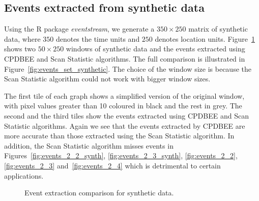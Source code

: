 \documentclass[a4paper,11pt]{article}
\begin{document}
\subsection{Events extracted from synthetic data}\label{subsec:eventsSynthetic}

Using the R package \textit{eventstream}, we generate a $350 \times 250$ matrix of synthetic data, where $350$ denotes the time units and $250$ denotes location units. Figure~\ref{fig:events_set_synthetic_just2} shows two $50 \times 250$ windows of synthetic data and the events extracted using CPDBEE and Scan Statistic algorithms. The full comparison is illustrated in Figure~\ref{fig:events_set_synthetic}. The choice of the window size is because the Scan Statistic algorithm could not work with bigger window sizes.

The first tile of each graph shows a simplified version of the  original window, with pixel values greater than 10 coloured in black and the rest in grey. The second and the third tiles show the events extracted using CPDBEE and Scan Statistic algorithms. Again we see that the events extracted by CPDBEE are more accurate than those extracted using the Scan Statistic algorithm. In addition, the Scan Statistic algorithm misses events in Figures~\ref{fig:events_2_2_synth}, \ref{fig:events_2_3_synth}, \ref{fig:events_2_2}, \ref{fig:events_2_3} and~\ref{fig:events_2_4} which is detrimental to certain applications.

\begin{figure}[!htb]
	\centering
	\caption{Event extraction comparison for synthetic data.}
	\label{fig:events_set_synthetic_just2}
\end{figure}
\end{document}
